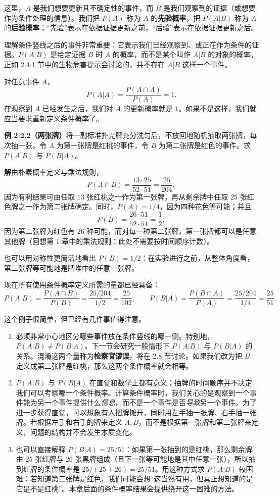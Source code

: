 \documentclass[UTF8,12pt,a4paper,fontset=fandol]{ctexart}
\begin{document}
这里，$A$ 是我们想要更新其不确定性的事件，而 $B$ 是我们观察到的证据（或想要作为条件处理的信息）。我们把 $P(A)$ 称为 $A$ 的\textbf{先验概率}，把 $P(A|B)$ 称为 $A$ 的\textbf{后验概率}；“先验”表示在依据证据更新之前，“后验”表示在依据证据更新之后。

理解条件竖线之后的事件非常重要：它表示我们已经观察到、或正在作为条件的证据。$P(A|B)$ 是给定证据 $B$ 时 $A$ 的概率，而不是某个叫作 $A|B$ 的对象的概率。正如 2.4.1 节中的生物危害提示会讨论的，并不存在 $A|B$ 这样一个事件。

对任意事件 $A$，
\[
  P(A|A)=\frac{P(A\cap A)}{P(A)}=1.
\]
在观察到 $A$ 已经发生之后，我们对 $A$ 的更新概率就是 $1$。如果不是这样，我们就应当要求重新定义条件概率了。

\noindent\textbf{例 2.2.2（两张牌）}\quad 将一副标准扑克牌充分洗匀后，不放回地随机抽取两张牌，每次抽一张。令 $A$ 为第一张牌是红桃的事件，令 $B$ 为第二张牌是红色的事件。求 $P(A|B)$ 与 $P(B|A)$。

\noindent\textbf{解}\quad 由朴素概率定义与乘法规则，
\[
  P(A\cap B)=\frac{13\cdot 25}{52\cdot 51}=\frac{25}{204},
\]
因为有利结果可由任取 $13$ 张红桃之一作为第一张牌，再从剩余牌中任取 $25$ 张红色牌之一作为第二张牌确定。同时，$P(A)=1/4$，因为四种花色等可能；并且
\[
  P(B)=\frac{26\cdot 51}{52\cdot 51}=\frac12,
\]
因为第二张牌为红色有 $26$ 种可能，而对每一种第二张牌，第一张牌都可以是任意其他牌（回想第 1 章中的乘法规则：此处不需要按时间顺序计数）。

也可以用对称性更简洁地看出 $P(B)=1/2$：在实验进行之前，从整体角度看，第二张牌等可能地是牌堆中的任意一张牌。

现在所有使用条件概率定义所需的量都已经具备：
\[
  P(A|B)=\frac{P(A\cap B)}{P(B)}
  =\frac{25/204}{1/2}=\frac{25}{102},
  \qquad
  P(B|A)=\frac{P(B\cap A)}{P(A)}
  =\frac{25/204}{1/4}=\frac{25}{51}.
\]

这个例子很简单，但已经有几件事值得注意。

\begin{enumerate}
  \item 必须非常小心地区分哪些事件放在条件竖线的哪一侧。特别地，$P(A|B)\ne P(B|A)$。下一节会研究一般情形下 $P(A|B)$ 与 $P(B|A)$ 的关系。混淆这两个量称为\textbf{检察官谬误}，将在 2.8 节讨论。如果我们改为把 $B$ 定义成第二张牌是红桃，那么这两个条件概率就会相等。
  \item $P(A|B)$ 与 $P(B|A)$ 在直觉和数学上都有意义；抽牌的时间顺序并不决定我们可以考察哪一个条件概率。计算条件概率时，我们关心的是观察到一个事件能为另一个事件提供什么\textit{信息}，而不是一个事件是否\textit{导致}另一个事件。为了进一步获得直觉，可以想象有人把牌摊开，同时用左手抽一张牌、右手抽一张牌。若根据左手和右手的牌来定义 $A,B$，而不是根据第一张牌和第二张牌来定义，问题的结构并不会发生本质变化。
  \item 也可以直接解释 $P(B|A)=25/51$：如果第一张抽到的是红桃，那么剩余牌由 $25$ 张红牌与 $26$ 张黑牌组成（且下一张等可能地是其中任意一张），所以抽到红牌的条件概率是 $25/(25+26)=25/51$。用这种方式求 $P(A|B)$ 较困难：若知道第二张牌是红色，我们可能会想“这当然有用，但真正想知道的是它是不是红桃”。本章后面的条件概率结果会提供绕开这一困难的方法。
\end{enumerate}
\end{document}
